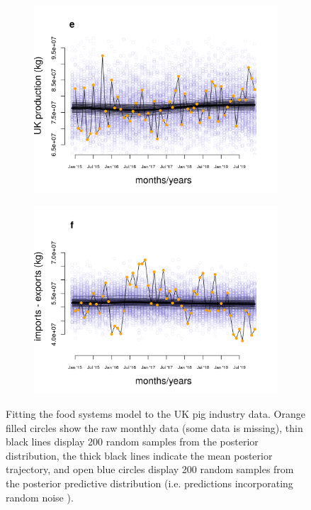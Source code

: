 \documentclass[9pt,twocolumn,twoside,lineno]{pnas-new}
\begin{document}
\begin{figure}[t!]
  \begin{subfigure}{0.5\textwidth}
   \centering
    \includegraphics[scale=0.4]{figure_3e.png}
  \end{subfigure}%
  \begin{subfigure}{0.5\textwidth}
   \centering
    \includegraphics[scale=0.4]{figure_3f.png}
  \end{subfigure}
  \caption{Fitting the food systems model to the UK pig industry data. Orange filled circles show the raw monthly data (some data is missing), thin black lines display 200 random samples from the posterior distribution, the thick black lines indicate the mean posterior trajectory, and open blue circles display 200 random samples from the posterior predictive distribution (i.e. predictions incorporating random noise ).}
  \label{fig:fig_posterior_predictions}
\end{figure}
\end{document}
